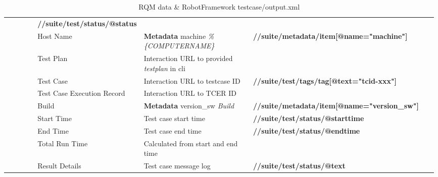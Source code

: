 \begin{table}[h]
\begin{tabular}{|p{0.11\linewidth}|p{0.12\linewidth}|p{0.31\linewidth}|p{0.45\linewidth}|}
                                                    &\textbf{//suite/test/status/@status}\\
                        \cline{2-4}
                        &Host Name    &\textbf{Metadata} machine \emph{\%\{COMPUTERNAME\}}
                                                    &\textbf{//suite/metadata/item[@name="machine"]}\\
                        \cline{2-4}
                        &Test Plan    &Interaction URL to provided \emph{testplan} in cli
                                                    &\\
                        \cline{2-4}
                        &Test Case    &Interaction URL to testcase ID
                                                    &\textbf{//suite/test/tags/tag[@text="tcid-xxx"]}\\
                        \cline{2-4}
                        &Test Case Execution Record 
                                      &Interaction URL to TCER ID
                                                    &\\
                        \cline{2-4}
                        &Build        &\textbf{Metadata} version\_sw \emph{Build}
                                                    &\textbf{//suite/metadata/item[@name="version\_sw"]}\\
                        \cline{2-4}
                        &Start Time   &Test case start time
                                                    &\textbf{//suite/test/status/@starttime}\\
                        \cline{2-4}
                        &End Time     &Test case end time
                                                    &\textbf{//suite/test/status/@endtime}\\
                        \cline{2-4}
                        &Total Run Time
                                      &Calculated from start and end time
                                                    &\\
                        \cline{2-4}
                        &Result Details 
                                      &Test case message log             
                                                    &\textbf{//suite/test/status/@text}\\
                        \cline{2-4}
      \hline
   \end{tabular} 
   \caption{RQM data \& RobotFramework testcase/output.xml}
\end{table}
